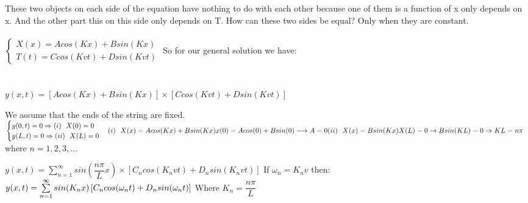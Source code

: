 \documentclass[fleqn]{article}
\begin{document}
\begin{enumerate}
      \textcolor{hwColor}{
        These two objects on each side of the equation have nothing to do with each other because one of them is a function of x only depends on x. And the other part this on this side only depends on T. 
        How can these two sides be equal? Only when they are constant. \\
        \\
        $
          \begin{cases}
            X(x)=Acos(Kx)+Bsin(Kx) \\
            T(t)=Ccos(Kvt)+Dsin(Kvt)
          \end{cases}
        $
        So for our general solution we have: \\
        \\
        \\
        $
          y(x,t)=\left[Acos(Kx)+Bsin(Kx)\right] \times \left[Ccos(Kvt)+Dsin(Kvt)\right]
        $
        \\
      }

      \textcolor{hwColor}{
        We assume that the ends of the string are fixed. \\
        $
          \begin{cases}
            y(0,t)=0 \Rightarrow (i) ~~ X(0)=0\\
            y(L,t)=0 \Rightarrow (ii) ~~ X(L)=0
          \end{cases}
          \\
          \\
          \\
          (i) ~~ X(x)=Acos(Kx)+Bsin(Kx) \\
          x(0)=Acos(0)+Bsin(0) \longrightarrow A=0 \\
          \\
          \\
          (ii) ~~ X(x)=Bsin(Kx) \\
          X(L)=0 \rightarrow Bsin(KL)=0 \Rightarrow KL=n\pi ~~
        $ where $n=1,2,3,...$ \\
      }

      \textcolor{hwColor}{
        $
          y(x,t)=\sum\limits_{n=1}^{\infty} sin(\dfrac{n\pi}{L}x) \times \left[C_ncos(K_nvt)+D_nsin(K_nvt)\right]
        $
         If $\omega_n=K_nv$ then: \\ 
        $
          \\
          y(x,t)=\sum\limits_{n=1}^{\infty} sin(K_nx)\left[C_ncos(\omega_n t)+D_nsin(\omega_n t)\right]
        $ Where $K_n=\dfrac{n\pi}{L}$
      }


\end{enumerate}
\end{document}
